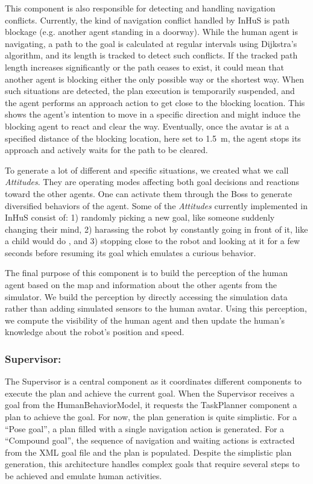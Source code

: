 This component is also responsible for detecting and handling navigation conflicts. Currently, the kind of navigation conflict handled by InHuS is path blockage (e.g. another agent standing in a doorway). While the human agent is navigating, a path to the goal is calculated at regular intervals using Dijkstra's algorithm, and its length is tracked to detect such conflicts. If the tracked path length increases significantly or the path ceases to exist, it could mean that another agent is blocking either the only possible way or the shortest way. When such situations are detected, the plan execution is temporarily suspended, and the agent performs an approach action to get close to the blocking location. This shows the agent's intention to move in a specific direction and might induce the blocking agent to react and clear the way.
Eventually, once the avatar is at a specified distance of the blocking location, here set to \SI{1.5}{\metre}, the agent stops its approach and actively waits for the path to be cleared.

To generate a lot of different and specific situations, we created what we call \textit{Attitudes}. They are operating modes affecting both goal decisions and reactions toward the other agents. One can activate them through the Boss to generate diversified behaviors of the agent. Some of the \textit{Attitudes} currently implemented in InHuS consist of: 1) randomly picking a new goal, like someone suddenly changing their mind, 2) harassing the robot by constantly going in front of it, like a child would do \cite{nomura2016children}, and 3) stopping close to the robot and looking at it for a few seconds before resuming its goal which emulates a curious behavior. 

The final purpose of this component is to build the perception of the human agent based on the map and information about the other agents from the simulator. We build the perception by directly accessing the simulation data rather than adding simulated sensors to the human avatar. Using this perception, we compute the visibility of the human agent and then update the human's knowledge about the robot's position and speed.

\subsubsection{Supervisor:}
The Supervisor is a central component as it coordinates different components to execute the plan and achieve the current goal. When the Supervisor receives a goal from the HumanBehaviorModel, it requests the TaskPlanner component a plan to achieve the goal. For now, the plan generation is quite simplistic. For a ``Pose goal'', a plan filled with a single navigation action is generated. For a ``Compound goal'', the sequence of navigation and waiting actions is extracted from the XML goal file and the plan is populated. Despite the simplistic plan generation, this architecture handles complex goals that require several steps to be achieved and emulate human activities.  

